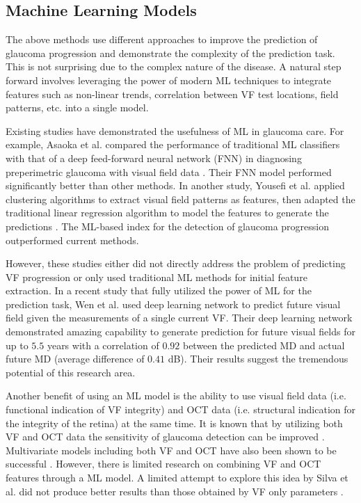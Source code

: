 \subsection{Machine Learning Models}

The above methods use different approaches to improve the prediction of glaucoma progression and demonstrate the complexity of the prediction task. This is not surprising due to the complex nature of the disease. A natural step forward involves leveraging the power of modern \acl{ML} techniques to integrate features such as non-linear trends, correlation between \acl{VF} test locations, field patterns, etc. into a single model.
 
Existing studies have demonstrated the usefulness of \acl{ML} in glaucoma care. For example, Asaoka et al. compared the performance of traditional \acl{ML} classifiers with that of a deep feed-forward neural network (FNN) in diagnosing preperimetric glaucoma with visual field data \cite{Asaoka2016}. Their FNN model performed significantly better than other methods. In another study, Yousefi et al. applied clustering algorithms to extract visual field patterns as features, then adapted the traditional linear regression algorithm to model the features to generate the predictions \cite{Yousefi2018}. The \acl{ML}-based index for the detection of glaucoma progression outperformed current methods. 

However, these studies either did not directly address the problem of predicting \acl{VF} progression or only used traditional \acl{ML} methods for initial feature extraction. In a recent study that fully utilized the power of \acl{ML} for the prediction task, Wen et al. \cite{Wen2018} used deep learning network to predict future visual field given the measurements of a single current \acl{VF}. Their deep learning network demonstrated amazing capability to generate prediction for future visual fields for up to $5.5$ years with a correlation of $0.92$ between the predicted \ac{MD} and actual future \ac{MD} (average difference of $0.41$ dB). Their results suggest the tremendous potential of this research area. 

Another benefit of using an \acl{ML} model is the ability to use visual field data (i.e. functional indication of \acl{VF} integrity) and \ac{OCT} data (i.e. structural indication for the integrity of the retina) at the same time. It is known that by utilizing both \acl{VF} and \ac{OCT} data the sensitivity of glaucoma detection can be improved \cite{Shah2006,Lu2008}. Multivariate models including both \acl{VF} and \ac{OCT} have also been shown to be successful \cite{Mwanza2013}. However, there is limited research on combining \acl{VF} and \ac{OCT} features through a \acl{ML} model. A limited attempt to explore this idea by Silva et al. did not produce better results than those obtained by \acl{VF} only parameters \cite{Silva2013}. 

